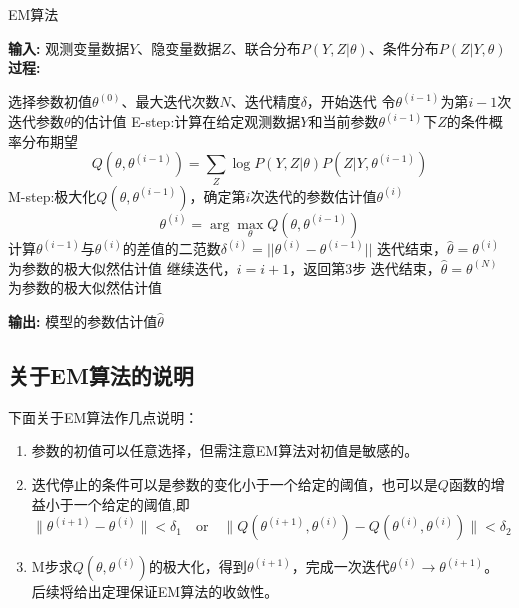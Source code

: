 \documentclass[a4paper,12pt]{ctexart} %
\begin{document}
\begin{center}
    \begin{minipage}{0.95\textwidth}
        \begin{algorithm}[H]
            \caption{EM算法} 
            \label{alg:em}
            {\bf 输入:} 观测变量数据$Y$、隐变量数据$Z$、联合分布$P(Y,Z|\theta)$、条件分布$P(Z|Y,\theta)$\\
            {\bf 过程:} 
            \begin{algorithmic}[1]
                \State 选择参数初值$\theta^{(0)}$、最大迭代次数$N$、迭代精度$\delta$，开始迭代
                \State 令$\theta^{(i-1)}$为第$i-1$次迭代参数$\theta$的估计值
                \State E-step:计算在给定观测数据$Y$和当前参数$\theta^{(i-1)}$下$Z$的条件概率分布期望
                \begin{equation}
                        Q(\theta,\theta^{(i-1)}) = \sum_Z\log P(Y,Z|\theta)P(Z|Y,\theta^{(i-1)})
                \end{equation}
                \State M-step:极大化$Q(\theta,\theta^{(i-1)})$，确定第$i$次迭代的参数估计值$\theta^{(i)}$
                \begin{equation}
                    \theta^{(i)} = \arg \max_{\theta}Q(\theta,\theta^{(i-1)})
                \end{equation}
                \State 计算$\theta^{(i-1)}$与$\theta^{(i)}$的差值的二范数$\delta^{(i)}=||\theta^{(i)}-\theta^{(i-1)}||$
                \State 迭代结束，$\hat{\theta} = \theta^{(i)}$为参数的极大似然估计值
                \Else
                \State 继续迭代，$i = i + 1$，返回第3步
                \EndIf
                \EndFor
                \State 迭代结束，$\hat{\theta} = \theta^{(N)}$为参数的极大似然估计值
            \end{algorithmic}
            {\bf 输出:} 模型的参数估计值$\hat{\theta}$
        \end{algorithm}
    \end{minipage}
\end{center}

\subsection{关于EM算法的说明}
下面关于EM算法作几点说明：
\begin{enumerate}
    \item 参数的初值可以任意选择，但需注意EM算法对初值是敏感的。
    \item 迭代停止的条件可以是参数的变化小于一个给定的阈值，也可以是$Q$函数的增益小于一个给定的阈值,即
    \begin{equation}
    \|\theta^{(i+1)} - \theta^{(i)}\| < \delta_1 \quad \text{or} \quad \|Q(\theta^{(i+1)},\theta^{(i)}) - Q(\theta^{(i)},\theta^{(i)})\| < \delta_2
    \end{equation}
    \item M步求$Q(\theta,\theta^{(i)})$的极大化，得到$\theta^{(i+1)}$，完成一次迭代$\theta^{(i)} \to \theta^{(i+1)}$。后续将给出定理保证EM算法的收敛性。
\end{enumerate}
\end{document}

